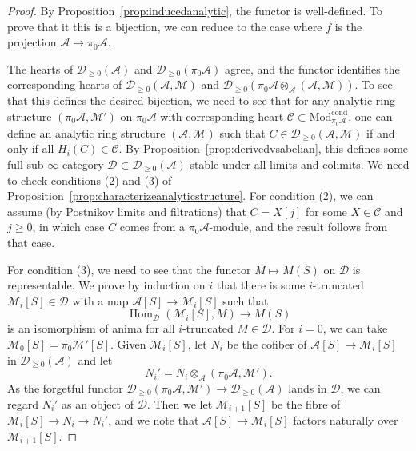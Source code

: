 \documentclass[11pt]{amsbook}
\DeclareMathOperator{\Hom}{Hom}
\newcommand{\CondMod}{\mathrm{Mod}^{\mathrm{cond}}}
\numberwithin{equation}{section}
\numberwithin{theorem}{section}
\theoremstyle{definition}
\begin{document}
\begin{proof} By Proposition~\ref{prop:inducedanalytic}, the functor is well-defined. To prove that it this is a bijection, we can reduce to the case where $f$ is the projection $\mathcal A\to \pi_0 \mathcal A$.

The hearts of $\mathcal D_{\geq 0}(\mathcal A)$ and $\mathcal D_{\geq 0}(\pi_0 \mathcal A)$ agree, and the functor identifies the corresponding hearts of $\mathcal D_{\geq 0}(\mathcal A,\mathcal M)$ and $\mathcal D_{\geq 0}(\pi_0 \mathcal A\otimes_{\mathcal A} (\mathcal A,\mathcal M))$. To see that this defines the desired bijection, we need to see that for any analytic ring structure $(\pi_0\mathcal A,\mathcal M')$ on $\pi_0\mathcal A$ with corresponding heart $\mathcal C\subset \CondMod_{\pi_0\mathcal A}$, one can define an analytic ring structure $(\mathcal A,\mathcal M)$ such that $C\in \mathcal D_{\geq 0}(\mathcal A,\mathcal M)$ if and only if all $H_i(C)\in \mathcal C$. By Proposition~\ref{prop:derivedvsabelian}, this defines some full sub-$\infty$-category $\mathcal D\subset \mathcal D_{\geq 0}(\mathcal A)$ stable under all limits and colimits. We need to check conditions (2) and (3) of Proposition~\ref{prop:characterizeanalyticstructure}. For condition (2), we can assume (by Postnikov limits and filtrations) that $C=X[j]$ for some $X\in \mathcal C$ and $j\geq 0$, in which case $C$ comes from a $\pi_0\mathcal A$-module, and the result follows from that case.

For condition (3), we need to see that the functor $M\mapsto M(S)$ on $\mathcal D$ is representable. We prove by induction on $i$ that there is some $i$-truncated $\mathcal M_i[S]\in \mathcal D$ with a map $\mathcal A[S]\to \mathcal M_i[S]$ such that
\[
\Hom_{\mathcal D}(\mathcal M_i[S],M)\to M(S)
\]
is an isomorphism of anima for all $i$-truncated $M\in \mathcal D$. For $i=0$, we can take $\mathcal M_0[S]=\pi_0 \mathcal M'[S]$. Given $\mathcal M_i[S]$, let $N_i$ be the cofiber of $\mathcal A[S]\to \mathcal M_i[S]$ in $\mathcal D_{\geq 0}(\mathcal A)$ and let
\[
N_i'=N_i\otimes_{\mathcal A} (\pi_0\mathcal A,\mathcal M').
\]
As the forgetful functor $\mathcal D_{\geq 0}(\pi_0\mathcal A,\mathcal M')\to \mathcal D_{\geq 0}(\mathcal A)$ lands in $\mathcal D$, we can regard $N_i'$ as an object of $\mathcal D$. Then we let $\mathcal M_{i+1}[S]$ be the fibre of $\mathcal M_i[S]\to N_i\to N_i'$, and we note that $\mathcal A[S]\to \mathcal M_i[S]$ factors naturally over $\mathcal M_{i+1}[S]$.


\end{proof}
\end{document}
